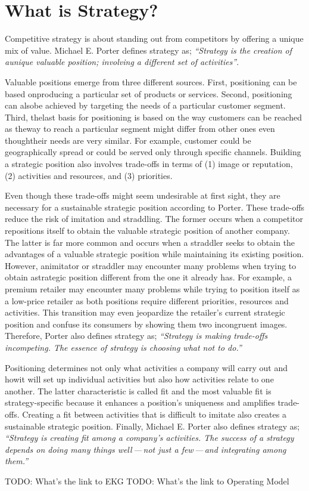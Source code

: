 \section*{What is Strategy?}

Competitive strategy is about standing out from competitors by offering a unique mix of value.
Michael E. Porter defines strategy as;
\emph{“Strategy is the creation of aunique valuable position; involving a different set of activities”}\autocite{what-is-strategy}.

Valuable positions emerge from three different sources.
First, positioning can be based onproducing a particular set of products or services.
Second, positioning can alsobe achieved by targeting the needs of a particular customer segment.
Third, thelast basis for positioning is based on the way customers can be reached as theway to reach a
particular segment might differ from other ones even thoughtheir needs are very similar.
For example, customer could be geographically spread or could be served only through specific channels.
Building a strategic position also involves trade-offs in terms of
(1) image or reputation,
(2) activities and resources, and
(3) priorities.

Even though these trade-offs might seem undesirable at first sight,
they are necessary for a sustainable strategic position according to Porter.
These trade-offs reduce the risk of imitation and straddling.
The former occurs when a competitor repositions itself to obtain the valuable strategic position of another company.
The latter is far more common and occurs when a straddler seeks to obtain the advantages of
a valuable strategic position while maintaining its existing position.
However, animitator or straddler may encounter many problems when trying to obtain astrategic position
different from the one it already has.
For example, a premium retailer may encounter many problems while trying to position itself as a low-price retailer
as both positions require different priorities, resources and activities.
This transition may even jeopardize the retailer’s current strategic position and confuse its consumers
by showing them two incongruent images.
Therefore, Porter also defines strategy as;
\emph{“Strategy is making trade-offs incompeting. The essence of strategy is choosing what not to do.”}

Positioning determines not only what activities a company will carry out and howit will set up individual
activities but also how activities relate to one another.
The latter characteristic is called fit and the most valuable fit is strategy-specific because it enhances a
position’s uniqueness and amplifies trade-offs.
Creating a fit between activities that is difficult to imitate also creates a sustainable strategic position.
Finally, Michael E. Porter also defines strategy as;
\emph{“Strategy is creating fit among a company’s activities.
The success of a strategy depends on doing many things well\,---\,not just a few\,---\,and
integrating among them.”}

TODO: What's the link to EKG
TODO: What's the link to Operating Model
